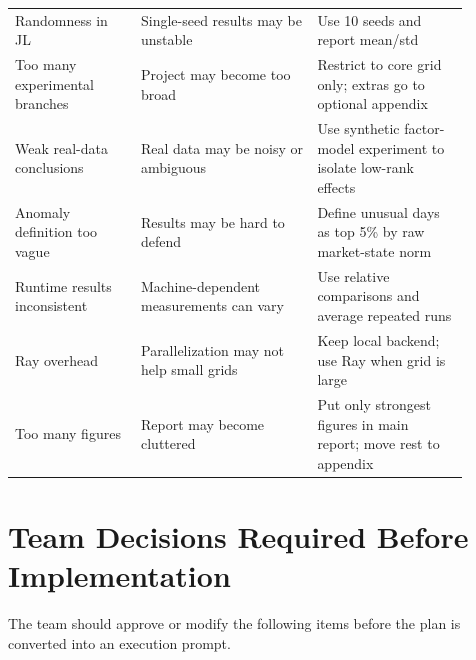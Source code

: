 \documentclass[11pt]{article}
\begin{document}
\begin{longtable}{p{0.25\linewidth} p{0.35\linewidth} p{0.30\linewidth}}
Randomness in JL & Single-seed results may be unstable & Use 10 seeds and report mean/std \\

Too many experimental branches & Project may become too broad & Restrict to core grid only; extras go to optional appendix \\

Weak real-data conclusions & Real data may be noisy or ambiguous & Use synthetic factor-model experiment to isolate low-rank effects \\

Anomaly definition too vague & Results may be hard to defend & Define unusual days as top 5\% by raw market-state norm \\

Runtime results inconsistent & Machine-dependent measurements can vary & Use relative comparisons and average repeated runs \\

Ray overhead & Parallelization may not help small grids & Keep local backend; use Ray when grid is large \\

Too many figures & Report may become cluttered & Put only strongest figures in main report; move rest to appendix \\

\bottomrule
\end{longtable}

\section{Team Decisions Required Before Implementation}

The team should approve or modify the following items before the plan is converted into an execution prompt.
\end{document}
